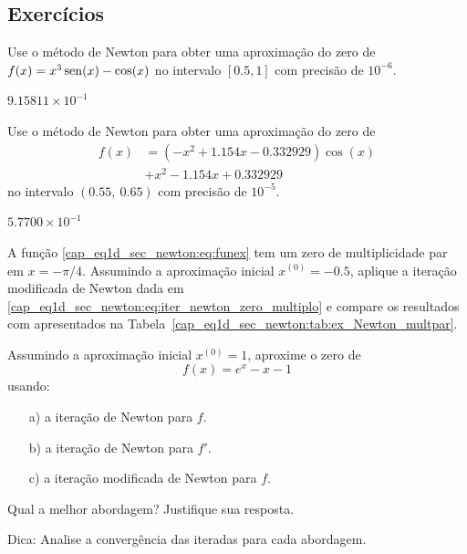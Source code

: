 \subsection*{Exercícios}

\begin{exer}\label{exer:Newton_1}
  Use o método de Newton para obter uma aproximação do zero de $f(x)=x^3\operatorname{sen}(x)-\cos(x)$ no intervalo $[0.5, 1]$ com precisão de $10^{-6}$.
\end{exer}
\begin{resp}
  $9.15811\times 10^{-1}$
\end{resp}

\begin{exer}\label{exer:Newton_multpar}
  Use o método de Newton para obter uma aproximação do zero de
  \begin{equation}
    \begin{aligned}
      f(x) &= (-x^2+1.154x-0.332929)\cos(x) \\
           &+ x^2 - 1.154x + 0.332929
    \end{aligned}
\end{equation}
no intervalo $(0.55, ~0.65)$ com precisão de $10^{-5}$.
\end{exer}
\begin{resp}
  $5.7700\times 10^{-1}$
\end{resp}

\begin{exer}\label{cap_eq1d_sec_newton:exer:iter_newton_zeros_multiplos}
  A função \eqref{cap_eq1d_sec_newton:eq:funex} tem um zero de multiplicidade par em $x=-\pi/4$. Assumindo a aproximação inicial $x^{(0)} = -0.5$, aplique a iteração modificada de Newton dada em \eqref{cap_eq1d_sec_newton:eq:iter_newton_zero_multiplo} e compare os resultados com apresentados na Tabela~\ref{cap_eq1d_sec_newton:tab:ex_Newton_multpar}.
\end{exer}

\begin{exer}
  Assumindo a aproximação inicial $x^{(0)} = 1$, aproxime o zero de
  \begin{equation}
    f(x) = e^x - x - 1
  \end{equation}
  usando:
  \begin{enumerate}[a)]
  \item[a)] a iteração de Newton para $f$.
  \item[b)] a iteração de Newton para $f'$.
  \item[c)] a iteração modificada de Newton para $f$.
  \end{enumerate}
  Qual a melhor abordagem? Justifique sua resposta.
\end{exer}
\begin{resp}
  Dica: Analise a convergência das iteradas para cada abordagem.
\end{resp}

